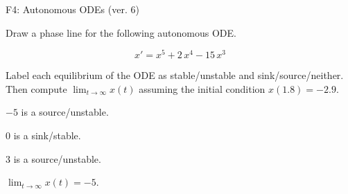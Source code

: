 \begin{exercise}
  \begin{exerciseTitle}F4: Autonomous ODEs (ver. 6)\end{exerciseTitle}
  \begin{exerciseStatement}
    

      Draw a phase line for the following 
      autonomous ODE.
    

    
\[x'= x^{5} + 2 \, x^{4} - 15 \, x^{3}\]

    

      Label each equilibrium of the ODE
      as stable/unstable and sink/source/neither.
      Then compute \(\lim_{t\to\infty}x(t)\)
      assuming the initial condition
      \(x( 1.8 )= -2.9\).
    

  \end{exerciseStatement}
  \begin{exerciseAnswer}
    

      \(-5\) is a source/unstable.
      
        \(0\) is a sink/stable.
      
      \(3\) is a source/unstable.
    

    

      \(\lim_{t\to\infty}x(t)=-5\).
    

  \end{exerciseAnswer}
\end{exercise}